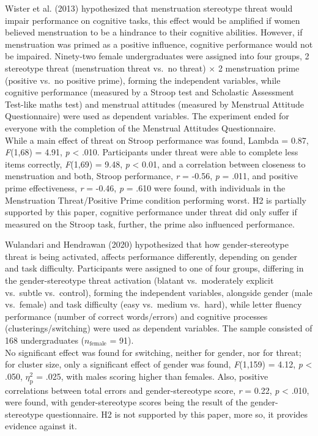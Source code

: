 \documentclass[
  stu, a4paper, 12pt,mask,floatsintext]{apa7}
\begin{document}
Wister et al. (2013) hypothesized that menstruation stereotype threat would impair performance on cognitive tasks, this effect would be amplified if women believed menstruation to be a hindrance to their cognitive abilities.
However, if menstruation was primed as a positive influence, cognitive performance would not be impaired.
Ninety-two female undergraduates were assigned into four groups, 2 stereotype threat (menstruation threat vs.~no threat) \(\times\) 2 menstruation prime (positive vs.~no positive prime), forming the independent variables, while cognitive performance (measured by a Stroop test and Scholastic Assessment Test-like maths test) and menstrual attitudes (measured by Menstrual Attitude Questionnaire) were used as dependent variables.
The experiment ended for everyone with the completion of the Menstrual Attitudes Questionnaire.\\
While a main effect of threat on Stroop performance was found, Lambda = 0.87, \emph{F}(1,68) = 4.91, \emph{p} \textless{} .010.
Participants under threat were able to complete less items correctly, \emph{F}(1,69) = 9.48, \emph{p} \textless{} 0.01, and a correlation between closeness to menstruation and both, Stroop performance, \emph{r} = -0.56, \emph{p} = .011, and positive prime effectiveness, \emph{r} = -0.46, \emph{p} = .610 were found, with individuals in the Menstruation Threat/Positive Prime condition performing worst.
H2 is partially supported by this paper, cognitive performance under threat did only suffer if measured on the Stroop task, further, the prime also influenced performance.

Wulandari and Hendrawan (2020) hypothesized that how gender-stereotype threat is being activated, affects performance differently, depending on gender and task difficulty.
Participants were assigned to one of four groups, differing in the gender-stereotype threat activation (blatant vs.~moderately explicit vs.~subtle vs.~control), forming the independent variables, alongside gender (male vs.~female) and task difficulty (easy vs.~medium vs.~hard), while letter fluency performance (number of correct words/errors) and cognitive processes (clusterings/switching) were used as dependent variables.
The sample consisted of 168 undergraduates (\(n_{\text{female}}\) = 91).\\
No significant effect was found for switching, neither for gender, nor for threat; for cluster size, only a significant effect of gender was found, \emph{F}(1,159) = 4.12, \emph{p} \textless{} .050, \(\eta^{2}_{\text{p}}\) = .025, with males scoring higher than females.
Also, positive correlations between total errors and gender-stereotype score, \emph{r} = 0.22, \emph{p} \textless{} .010, were found, with gender-stereotype scores being the result of the gender-stereotype questionnaire.
H2 is not supported by this paper, more so, it provides evidence against it.
\end{document}

